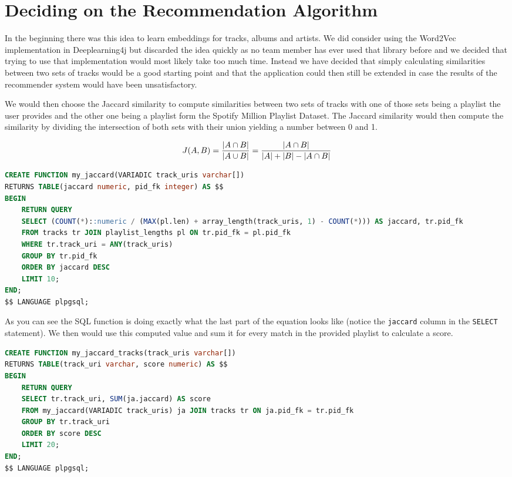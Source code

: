 \section{Deciding on the Recommendation Algorithm}

In the beginning there was this idea to learn embeddings for tracks, albums and artists. We did consider using the Word2Vec implementation in Deeplearning4j but discarded the idea quickly as no team member has ever used that library before and we decided that trying to use that implementation would most likely take too much time. Instead we have decided that simply calculating similarities between two sets of tracks would be a good starting point and that the application could then still be extended in case the results of the recommender system would have been unsatisfactory.

We would then choose the Jaccard similarity to compute similarities between two sets of tracks with one of those sets being a playlist the user provides and the other one being a playlist form the Spotify Million Playlist Dataset. The Jaccard similarity would then compute the similarity by dividing the intersection of both sets with their union yielding a number between 0 and 1.

\begin{equation}
    J(A,B) = {{|A \cap B|}\over{|A \cup B|}} = {{|A \cap B|}\over{|A| + |B| - |A \cap B|}}
\end{equation}

\begin{lstlisting}[caption={Jaccard implementation as a SQL function in PostgreSQL}, style=Base, language=SQL]
CREATE FUNCTION my_jaccard(VARIADIC track_uris varchar[])
RETURNS TABLE(jaccard numeric, pid_fk integer) AS $$
BEGIN
    RETURN QUERY
    SELECT (COUNT(*)::numeric / (MAX(pl.len) + array_length(track_uris, 1) - COUNT(*))) AS jaccard, tr.pid_fk
    FROM tracks tr JOIN playlist_lengths pl ON tr.pid_fk = pl.pid_fk
    WHERE tr.track_uri = ANY(track_uris)
    GROUP BY tr.pid_fk
    ORDER BY jaccard DESC
    LIMIT 10;
END;
$$ LANGUAGE plpgsql;
\end{lstlisting}

As you can see the SQL function is doing exactly what the last part of the equation looks like (notice the \texttt{jaccard} column in the \texttt{SELECT} statement). We then would use this computed value and sum it for every match in the provided playlist to calculate a score.

\begin{lstlisting}[caption={Using the implementation to compute scores for tracks}, style=Base, language=SQL]
CREATE FUNCTION my_jaccard_tracks(track_uris varchar[])
RETURNS TABLE(track_uri varchar, score numeric) AS $$
BEGIN
    RETURN QUERY
    SELECT tr.track_uri, SUM(ja.jaccard) AS score
    FROM my_jaccard(VARIADIC track_uris) ja JOIN tracks tr ON ja.pid_fk = tr.pid_fk
    GROUP BY tr.track_uri
    ORDER BY score DESC
    LIMIT 20;
END;
$$ LANGUAGE plpgsql;
\end{lstlisting}

